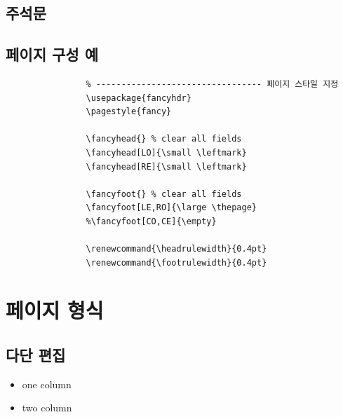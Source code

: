 \documentclass[12pt, a4paper, oneside]{book}
\renewcommand{\headrulewidth}{1.0pt}
\renewcommand{\footrulewidth}{0.4pt}
\let\stdsection\section
\renewcommand\section{\newpage\stdsection}
\begin{document}
\newpage \null
\section{주석문}



	\newpage  \null
	\section{페이지 구성 예}
	
		\singlespacing
		\setlength{\fboxsep}{12pt}
		\begin{boxedminipage}[c]{1.0\linewidth}
			\begin{verbatim}
				% --------------------------------- 페이지 스타일 지정
				\usepackage{fancyhdr}
				\pagestyle{fancy}
				
				\fancyhead{} % clear all fields
				\fancyhead[LO]{\small \leftmark}
				\fancyhead[RE]{\small \leftmark}
				
				\fancyfoot{} % clear all fields
				\fancyfoot[LE,RO]{\large \thepage}
				%\fancyfoot[CO,CE]{\empty}
				
				\renewcommand{\headrulewidth}{0.4pt}
				\renewcommand{\footrulewidth}{0.4pt}
			\end{verbatim} 
		\end{boxedminipage}
		\doublespacing
	
	




		
	\chapter{페이지 형식}

		\minitoc				%

	\newpage  \null
	\section{다단 편집}
	\null
	
			\begin{itemize}
			\item one column
			\item two column
			\end{itemize}
	
\end{document}
